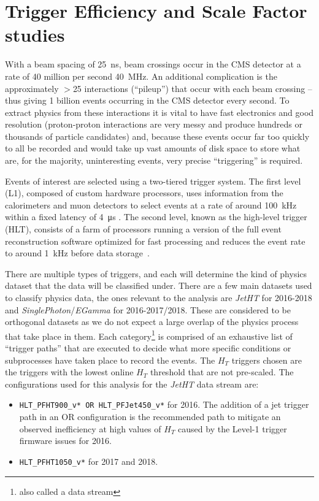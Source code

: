 \clearpage

\section{Trigger Efficiency and Scale Factor studies}


With a beam spacing of 25~\unit{ns}, beam crossings occur in the CMS detector at a rate of 40 million per second 40~\unit{\MHz}.
An additional complication is the approximately $>$25 interactions (``pileup'') that occur with each beam crossing -- thus giving 1 billion events occurring in the CMS detector every second. To extract physics from these interactions it is vital to have fast electronics and good resolution (proton-proton interactions are very messy and produce hundreds or thousands of particle candidates) and, because these events occur far too quickly to all be recorded and would take up vast amounts of disk space to store what are, for the majority, uninteresting events, very precise ``triggering'' is required.

Events of interest are selected using a two-tiered trigger system. The first level (L1), composed of custom hardware processors, uses information from the calorimeters and muon detectors to select events at a rate of around 100~\unit{kHz} within a fixed latency of 4~\unit{\us} \cite{CMS:2020cmk}. The second level, known as the high-level trigger (HLT), consists of a farm of processors running a version of the full event reconstruction software optimized for fast processing and reduces the event rate to around 1~\unit{kHz} before data storage~\cite{CMS:2016ngn}.

There are multiple types of triggers, and each will determine the kind of physics dataset that the data will be classified under. There are a few main datasets used to classify physics data, the ones relevant to the analysis are \emph{JetHT} for 2016-2018 and \emph{SinglePhoton}/\emph{EGamma} for 2016-2017/2018. These are considered to be orthogonal datasets as we do not expect a large overlap of the physics process that take place in them. Each category\footnote{also called a data stream} is comprised of an exhaustive list of ``trigger paths'' that are executed to decide what more specific conditions or subprocesses have taken place to record the events.
The $H_T$ triggers chosen are the triggers with the lowest online $H_T$ threshold that are not pre-scaled. The configurations used for this analysis for the \textit{JetHT} data stream are:

\begin{itemize}
	\item \verb|HLT_PFHT900_v* OR HLT_PFJet450_v*| for 2016. The addition of a jet trigger path in an OR configuration is the recommended path to mitigate an observed inefficiency at high values of $H_T$ caused by the Level-1 trigger firmware issues for 2016.
	\item \verb|HLT_PFHT1050_v*| for 2017 and 2018.
\end{itemize}

